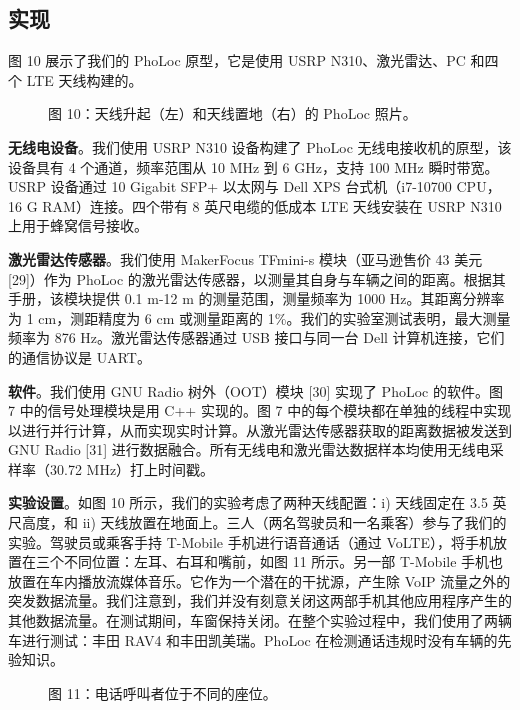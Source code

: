 \documentclass[journal, onecolumn]{IEEEtran}
\begin{document}
\subsection{实现}
图 10 展示了我们的 PhoLoc 原型，它是使用 USRP N310、激光雷达、PC 和四个 LTE 天线构建的。

\begin{figure}[htbp]
\centering
\caption{图 10：天线升起（左）和天线置地（右）的 PhoLoc 照片。}
\label{fig:10}
\end{figure}

\textbf{无线电设备}。我们使用 USRP N310 设备构建了 PhoLoc 无线电接收机的原型，该设备具有 4 个通道，频率范围从 10 MHz 到 6 GHz，支持 100 MHz 瞬时带宽。USRP 设备通过 10 Gigabit SFP+ 以太网与 Dell XPS 台式机（i7-10700 CPU，16 G RAM）连接。四个带有 8 英尺电缆的低成本 LTE 天线安装在 USRP N310 上用于蜂窝信号接收。

\textbf{激光雷达传感器}。我们使用 MakerFocus TFmini-s 模块（亚马逊售价 43 美元 [29]）作为 PhoLoc 的激光雷达传感器，以测量其自身与车辆之间的距离。根据其手册，该模块提供 0.1 m-12 m 的测量范围，测量频率为 1000 Hz。其距离分辨率为 1 cm，测距精度为 6 cm 或测量距离的 1\%。我们的实验室测试表明，最大测量频率为 876 Hz。激光雷达传感器通过 USB 接口与同一台 Dell 计算机连接，它们的通信协议是 UART。

\textbf{软件}。我们使用 GNU Radio 树外（OOT）模块 [30] 实现了 PhoLoc 的软件。图 7 中的信号处理模块是用 C++ 实现的。图 7 中的每个模块都在单独的线程中实现以进行并行计算，从而实现实时计算。从激光雷达传感器获取的距离数据被发送到 GNU Radio [31] 进行数据融合。所有无线电和激光雷达数据样本均使用无线电采样率（30.72 MHz）打上时间戳。

\textbf{实验设置}。如图 10 所示，我们的实验考虑了两种天线配置：i) 天线固定在 3.5 英尺高度，和 ii) 天线放置在地面上。三人（两名驾驶员和一名乘客）参与了我们的实验。驾驶员或乘客手持 T-Mobile 手机进行语音通话（通过 VoLTE），将手机放置在三个不同位置：左耳、右耳和嘴前，如图 11 所示。另一部 T-Mobile 手机也放置在车内播放流媒体音乐。它作为一个潜在的干扰源，产生除 VoIP 流量之外的突发数据流量。我们注意到，我们并没有刻意关闭这两部手机其他应用程序产生的其他数据流量。在测试期间，车窗保持关闭。在整个实验过程中，我们使用了两辆车进行测试：丰田 RAV4 和丰田凯美瑞。PhoLoc 在检测通话违规时没有车辆的先验知识。

\begin{figure}[htbp]
\centering
\caption{图 11：电话呼叫者位于不同的座位。}
\label{fig:11}
\end{figure}
\end{document}
